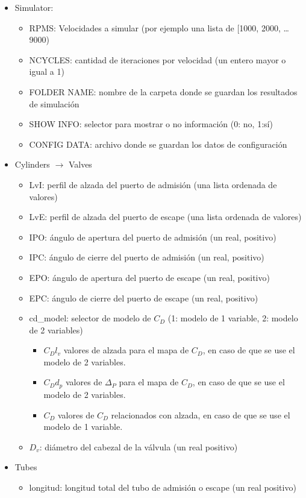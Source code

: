 \begin{itemize}
  \item Simulator:
        \begin{itemize}
          \item RPMS: Velocidades a simular (por ejemplo una lista de [1000, 2000, \ldots 9000)
          \item NCYCLES: cantidad de iteraciones por velocidad (un entero mayor o igual a 1)
          \item FOLDER NAME: nombre de la carpeta donde se guardan los resultados de simulación
          \item SHOW INFO: selector para mostrar o no información (0: no, 1:sí)
          \item CONFIG DATA: archivo donde se guardan los datos de configuración
        \end{itemize}
  \item Cylinders $\longrightarrow$ Valves
        \begin{itemize}
          \item LvI: perfil de alzada del puerto de admisión (una lista ordenada de valores)
          \item LvE: perfil de alzada del puerto de escape (una lista ordenada de valores)
          \item IPO: ángulo de apertura del puerto de admisión (un real, positivo)
          \item IPC: ángulo de cierre del puerto de admisión (un real, positivo)
          \item EPO: ángulo de apertura del puerto de escape (un real, positivo)
          \item EPC: ángulo de cierre del puerto de escape (un real, positivo)
          \item cd\_model: selector de modelo de $C_{D}$ (1: modelo de 1 variable, 2: modelo de 2 variables)
                \begin{itemize}
                  \item $C_{D}l_{v}$ valores de alzada para el mapa de $C_{D}$,
en caso de que se use el modelo de 2 variables.
                  \item $C_{D}d_{p}$ valores de $\Delta_{P}$ para el mapa de
$C_{D}$, en caso de que se use el modelo de 2 variables.
                  \item $C_{D}$ valores de $C_{D}$ relacionados con alzada, en
caso de que se use el modelo de 1 variable.
                \end{itemize}
          \item $D_{v}$: diámetro del cabezal de la válvula (un real positivo)
        \end{itemize}
  \item Tubes
        \begin{itemize}
          \item longitud: longitud total del tubo de admisión o escape (un real positivo)
        \end{itemize}
\end{itemize}

